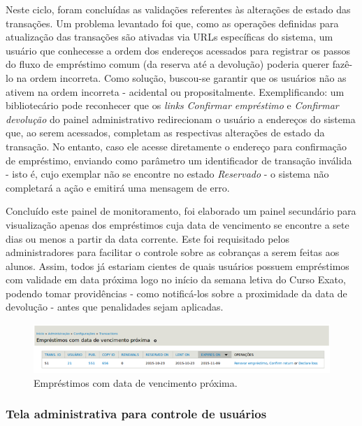 \documentclass[a4paper]{article}
\begin{document}
Neste ciclo, foram concluídas as validações referentes às alterações de estado das transações. Um problema levantado foi que, como as operações definidas para atualização das transações são ativadas via URLs específicas do sistema, um usuário que conhecesse a ordem dos endereços acessados para registrar os passos do fluxo de empréstimo comum (da reserva até a devolução) poderia querer fazê-lo na ordem incorreta. Como solução, buscou-se garantir que os usuários não as ativem na ordem incorreta - acidental ou propositalmente. Exemplificando: um bibliotecário pode reconhecer que os \textit{links} \textit{Confirmar empréstimo} e \textit{Confirmar devolução} do painel administrativo redirecionam o usuário a endereços do sistema que, ao serem acessados, completam as respectivas alterações de estado da transação. No entanto, caso ele acesse diretamente o endereço para confirmação de empréstimo, enviando como parâmetro um identificador de transação inválida - isto é, cujo exemplar não se encontre no estado \textit{Reservado} - o sistema não completará a ação e emitirá uma mensagem de erro.

Concluído este painel de monitoramento, foi elaborado um painel secundário para visualização apenas dos empréstimos cuja data de vencimento se encontre a sete dias ou menos a partir da data corrente. Este foi requisitado pelos administradores para facilitar o controle sobre as cobranças a serem feitas aos alunos. Assim, todos já estariam cientes de quais usuários possuem empréstimos com validade em data próxima logo no início da semana letiva do Curso Exato, podendo tomar providências - como notificá-los sobre a proximidade da data de devolução - antes que penalidades sejam aplicadas.

\begin{figure}[pbth!]
\centering
\includegraphics[width=150mm]{img/expiring-soon.png}
\caption{Empréstimos com data de vencimento próxima.\label{expiring-soon}}
\end{figure}

\subsubsection{Tela administrativa para controle de usuários}
\end{document}

